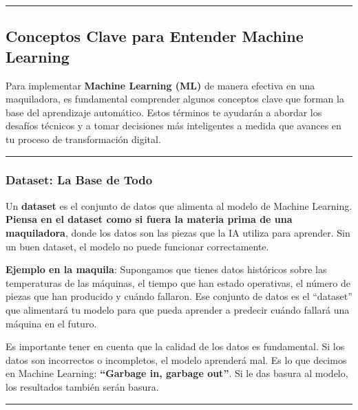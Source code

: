 \documentclass[
  10pt,
  letterpaper,
]{book}
\begin{document}
\begin{center}\rule{0.5\linewidth}{0.5pt}\end{center}

\subsection{Conceptos Clave para Entender Machine
Learning}\label{conceptos-clave-para-entender-machine-learning}

Para implementar \textbf{Machine Learning (ML)} de manera efectiva en
una maquiladora, es fundamental comprender algunos conceptos clave que
forman la base del aprendizaje automático. Estos términos te ayudarán a
abordar los desafíos técnicos y a tomar decisiones más inteligentes a
medida que avances en tu proceso de transformación digital.

\begin{center}\rule{0.5\linewidth}{0.5pt}\end{center}

\subsubsection{\texorpdfstring{\textbf{Dataset: La Base de
Todo}}{Dataset: La Base de Todo}}\label{dataset-la-base-de-todo}

Un \textbf{dataset} es el conjunto de datos que alimenta al modelo de
Machine Learning. \textbf{Piensa en el dataset como si fuera la materia
prima de una maquiladora}, donde los datos son las piezas que la IA
utiliza para aprender. Sin un buen dataset, el modelo no puede funcionar
correctamente.

\textbf{Ejemplo en la maquila}: Supongamos que tienes datos históricos
sobre las temperaturas de las máquinas, el tiempo que han estado
operativas, el número de piezas que han producido y cuándo fallaron. Ese
conjunto de datos es el ``dataset'' que alimentará tu modelo para que
pueda aprender a predecir cuándo fallará una máquina en el futuro.

Es importante tener en cuenta que la calidad de los datos es
fundamental. Si los datos son incorrectos o incompletos, el modelo
aprenderá mal. Es lo que decimos en Machine Learning: \textbf{``Garbage
in, garbage out''}. Si le das basura al modelo, los resultados también
serán basura.

\begin{center}\rule{0.5\linewidth}{0.5pt}\end{center}
\end{document}
